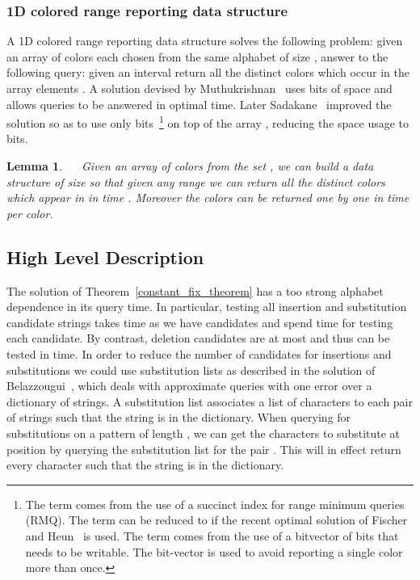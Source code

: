 \documentclass{article}
\newcommand{\?}{\mskip1.5mu}
\newtheorem{lemma}{Lemma}
\begin{document}
\subsubsection{1D colored range reporting data structure}
A 1D colored range reporting data structure solves the following problem: given an array  of colors each chosen from the same alphabet of size , answer to the following query: given an interval  return all the  distinct colors which occur in the array elements . A solution devised by Muthukrishnan~\cite{Mu02} uses  bits of space and allows queries to be answered in optimal  time. Later Sadakane~\cite{Sa07} improved the solution so as to use only  bits~\footnote{The term  comes from the use of a succinct index for range minimum queries (RMQ). The term can be reduced to  if the recent optimal solution of Fischer and Heun~\cite{Fi10} is used. The term  comes from the use of a bitvector of  bits that needs to be writable. The bit-vector is used to avoid reporting a single color more than once.} on top of the array , reducing the space usage to  bits. \begin{lemma}~\cite{Sa07}
~\label{lemma:1D_color_rep}
Given an array  of colors from the set , we can build a data structure of size  so that given any range  we can return all the  distinct colors which appear in  in time . Moreover the colors can be returned one by one in  time per color.
\end{lemma}

\subsection{High Level Description}
\label{section:arb_high_level_desc}

The solution of Theorem~\ref{constant_fix_theorem} has a too strong alphabet dependence in its query time. In particular, testing all insertion and substitution candidate strings takes  time as we have  candidates and spend  time for testing each candidate. By contrast, deletion candidates are at most  and thus can be tested in  time. 
In order to reduce the number of candidates for insertions and substitutions we could use substitution lists as described in the solution of Belazzougui~\cite{B09}, which deals with approximate queries with one error over a dictionary of strings. 
A substitution list associates a list of characters   to each pair of strings  such that the string  is in the dictionary. When querying for substitutions on a pattern  of length , we can get the characters to substitute at position  by querying the substitution list for the pair . This will in effect return every character  such that the string  is in the dictionary. 
\end{document}
